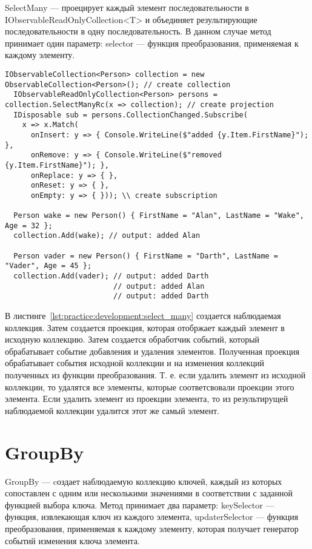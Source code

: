 SelectMany --- проецирует каждый элемент последовательности в IObservableReadOnlyCollection<T> и объединяет результирующие последовательности в одну последовательность.
В данном случае метод принимает один параметр: selector --- функция преобразования, применяемая к каждому элементу.

\begin{lstlisting}[style=csharpinlinestyle, caption={Пример использования SelectMany}, label=lst:practice:development:select_many]
  IObservableCollection<Person> collection = new ObservableCollection<Person>(); // create collection
  IObservableReadOnlyCollection<Person> persons = collection.SelectManyRc(x => collection); // create projection
  IDisposable sub = persons.CollectionChanged.Subscribe(
    x => x.Match(
      onInsert: y => { Console.WriteLine($"added {y.Item.FirstName}"); },
      onRemove: y => { Console.WriteLine($"removed {y.Item.FirstName}"); },
      onReplace: y => { },
      onReset: y => { },
      onEmpty: y => { })); \\ create subscription

  Person wake = new Person() { FirstName = "Alan", LastName = "Wake", Age = 32 };
  collection.Add(wake); // output: added Alan

  Person vader = new Person() { FirstName = "Darth", LastName = "Vader", Age = 45 };
  collection.Add(vader); // output: added Darth
                         // output: added Alan
                         // output: added Darth
\end{lstlisting}

В листинге~\ref{lst:practice:development:select_many} создается наблюдаемая коллекция. Затем создается проекция, которая отобржает каждый элемент в исходную коллекцию.
Затем создается обработчик событий, который обрабатывает событие добавления и удаления элементов.
Полученная проекция обрабатывает события исходной коллекции и на изменения коллекций полученных из функции преобразования.
Т. е. если удалить элемент из исходной коллекции, то удалятся все элементы, которые соответсвовали проекции этого элемента.
Если удалить элемент из проекции элемента, то из результирущей наблюдаемой коллекции удалится этот же самый элемент.

\section{GroupBy}
\label{sub:development:group_by}

GroupBy --- cоздает наблюдаемую коллекцию ключей, каждый из которых сопоставлен с одним или несколькими значениями в соответствии с заданной функцией выбора ключа.
Метод принимает два параметр: keySelector --- функция, извлекающая ключ из каждого элемента, updaterSelector --- функция преобразования,
применяемая к каждому элементу, которая получает генератор событий изменения ключа элемента.

